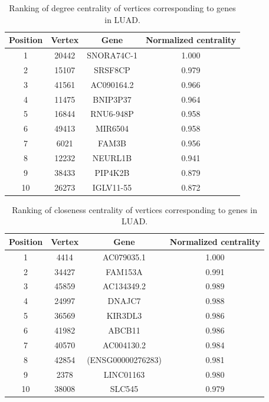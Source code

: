 \documentclass[12pt,a4paper]{report}
\begin{document}
\begin{table}[H]
\centering
\caption{Ranking of degree centrality of vertices corresponding to genes in LUAD.}
\label{tab:luad1}
\begin{tabular}{cccc}
\hline
\textbf{Position}         & \textbf{Vertex}     & \textbf{Gene}   & \textbf{Normalized centrality}   \\
\hline
   1       &    20442       &  SNORA74C-1         &           1.000 \\
   2      &     15107      & SRSF8CP        &    0.979        \\
   3       &    41561       & AC090164.2          &           0.966 \\
   4       &    11475       &  BNIP3P37         &0.964            \\
   5       &    16844       & RNU6-948P          &  0.958          \\
   6       &    49413       &   MIR6504        & 0.958           \\
   7       &    6021       &    FAM3B       &  0.956          \\
   8       &    12232       &    NEURL1B       & 0.941           \\
   9       &    38433       &    PIP4K2B       &    0.879        \\
   10       &   26273        &      IGLV11-55     &           0.872 \\
\hline
\end{tabular}
\end{table}

\begin{table}[H]
\centering
\caption{Ranking of closeness centrality of vertices corresponding to genes in LUAD.}
\label{tab:luad2}
\begin{tabular}{cccc}
\hline
\textbf{Position}         & \textbf{Vertex}     & \textbf{Gene}   & \textbf{Normalized centrality}   \\
\hline
   1       &    4414       &  AC079035.1         &  1.000          \\
   2      & 34427          &  FAM153A         &   0.991         \\
   3       &     45859      &  AC134349.2         &   0.989         \\
   4       &24997           &   DNAJC7        &   0.988         \\
   5       &     36569      &     KIR3DL3      &   0.986         \\
   6       &  41982         &   ABCB11        &   0.986         \\
   7       &   40570        &     AC004130.2      &   0.984         \\
   8       &    42854       &    (ENSG00000276283)       &   0.981         \\
   9       &     2378      &   LINC01163        &   0.980         \\
   10       &        38008   &  SLC545         &   0.979         \\
\hline
\end{tabular}
\end{table}
\end{document}
